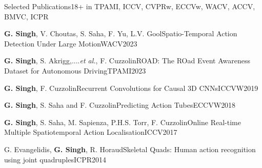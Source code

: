 \documentclass{resume} %
\begin{document}
\vspace{0.1in}
\begin{rSection}{Selected Publications}{18+\footnotesize{ in TPAMI, ICCV, CVPRw, ECCVw, WACV, ACCV, BMVC, ICPR}}
\begin{pSubsection}{\textbf{G. Singh}, V. Choutas, S. Saha, F. Yu, L.V. Gool}{Spatio-Temporal Action Detection Under Large Motion}{WACV}{2023}\end{pSubsection}
\begin{pSubsection}{\textbf{G. Singh}, S. Akrigg,....\textit{et al.},
  F. Cuzzolin}{ROAD: The ROad Event Awareness Dataset for Autonomous Driving}{TPAMI}{2023}\end{pSubsection}
\begin{pSubsection}{\textbf{G. Singh}, F. Cuzzolin}{Recurrent Convolutions for Causal 3D CNNs}{ICCVW}{2019}\end{pSubsection}
\begin{pSubsection}{\textbf{G. Singh}, S. Saha and F. Cuzzolin}{Predicting Action Tubes}{ECCVW}{2018}\end{pSubsection}
\begin{pSubsection}{\textbf{G. Singh}, S. Saha, M. Sapienza, P.H.S. Torr, F. Cuzzolin}{Online Real-time Multiple Spatiotemporal Action Localisation}{ICCV}{2017}\end{pSubsection}
\begin{pSubsection}{G. Evangelidis, \textbf{G. Singh}, R. Horaud}{Skeletal Quads: Human action recognition using joint quadruples}{ICPR}{2014}\end{pSubsection}

\end{rSection}
\end{document}
